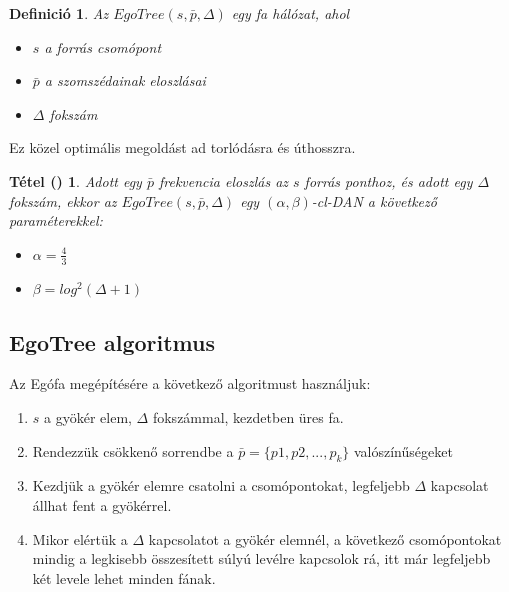 \documentclass[12pt]{report}
\newtheorem{mydef}{Definició}
\newtheorem{mytetel}{Tétel (\cite{avin_demand-aware_nodate})}
\begin{document}
\begin{mydef}
	Az \(EgoTree(s, \bar{p}, \Delta) \) egy fa hálózat, ahol
	\begin{itemize}
		\item \(s\) a forrás csomópont
		\item \(\bar{p}\) a szomszédainak eloszlásai
		\item \(\Delta\) fokszám
	\end{itemize}
\end{mydef}

Ez közel optimális megoldást ad torlódásra és úthosszra.


\begin{mytetel}
	Adott egy  \(\bar{p}\) frekvencia eloszlás az \(s\) forrás ponthoz, és adott egy \(\Delta\) fokszám, ekkor az \(EgoTree(s, \bar{p}, \Delta)\) egy \((\alpha, \beta)\)-cl-DAN a következő paraméterekkel:
	\begin{itemize}
		\item \(\alpha = \frac{4}{3}\)
		\item \(\beta = log^2(\Delta + 1)\)
	\end{itemize}
\end{mytetel}

\subsection{EgoTree algoritmus}

Az Egófa megépítésére a következő algoritmust használjuk:

\begin{enumerate}
	\item \(s\) a gyökér elem, \(\Delta\) fokszámmal, kezdetben üres fa.
	\item Rendezzük csökkenő sorrendbe a \(\bar{p} = \{p1, p2, ..., p_k\}\) valószínűségeket 
	\item Kezdjük a gyökér elemre csatolni a csomópontokat, legfeljebb \(\Delta\) kapcsolat állhat fent a gyökérrel.
	\item Mikor elértük a \(\Delta\) kapcsolatot a gyökér elemnél, a következő csomópontokat mindig a legkisebb összesített súlyú levélre kapcsolok rá, itt már legfeljebb két levele lehet minden fának.
\end{enumerate}
\end{document}
